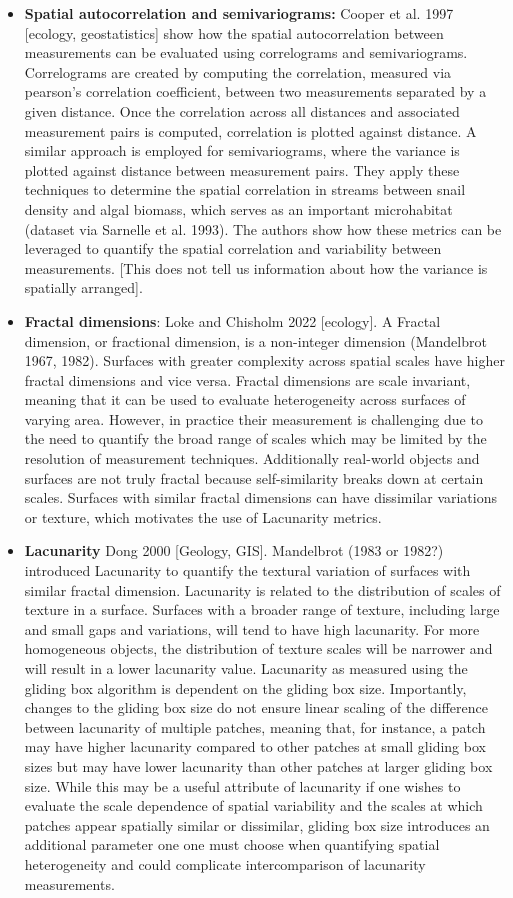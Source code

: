 \begin{itemize}
\item {\bf Spatial autocorrelation and semivariograms:} Cooper et al. 1997 [ecology, geostatistics] show how the spatial autocorrelation between measurements can be evaluated using correlograms and semivariograms. Correlograms are created by computing the correlation, measured via pearson’s correlation coefficient, between two measurements separated by a given distance. Once the correlation across all distances and associated measurement pairs is computed, correlation is plotted against distance. A similar approach is employed for semivariograms, where the variance is plotted against distance between measurement pairs. They apply these techniques to determine the spatial correlation in streams between snail density and algal biomass, which serves as an important microhabitat (dataset via Sarnelle et al. 1993). The authors show how these metrics can be leveraged to quantify the spatial correlation and variability between measurements. [This does not tell us information about how the variance is spatially arranged]. 
\item {\bf Fractal dimensions}: Loke and Chisholm 2022 [ecology]. A Fractal dimension, or fractional dimension, is a non-integer dimension (Mandelbrot 1967, 1982). Surfaces with greater complexity across spatial scales have higher fractal dimensions and vice versa. Fractal dimensions are scale invariant, meaning that it can be used to evaluate heterogeneity across surfaces of varying area. However, in practice their measurement is challenging due to the need to quantify the broad range of scales which may be limited by the resolution of measurement techniques. Additionally real-world objects and surfaces are not truly fractal because self-similarity breaks down at certain scales. Surfaces with similar fractal dimensions can have dissimilar variations or texture, which motivates the use of Lacunarity metrics.
\item {\bf Lacunarity} Dong 2000 [Geology, GIS]. Mandelbrot (1983 or 1982?) introduced Lacunarity to quantify the textural variation of surfaces with similar fractal dimension. 
Lacunarity is related to the distribution of scales of texture in a surface. Surfaces with a broader range of texture, including large and small gaps and variations, will tend to have high lacunarity. For more homogeneous objects, the distribution of texture scales will be narrower and will result in a lower lacunarity value. Lacunarity as measured using the gliding box algorithm is dependent on the gliding box size. Importantly, changes to the gliding box size do not ensure linear scaling of the difference between lacunarity of multiple patches, meaning that, for instance, a patch may have higher lacunarity compared to other patches at small gliding box sizes but may have lower lacunarity than other patches at larger gliding box size. While this may be a useful attribute of lacunarity if one wishes to evaluate the scale dependence of spatial variability and the scales at which patches appear spatially similar or dissimilar, gliding box size introduces an additional parameter one one must choose when quantifying spatial heterogeneity and could complicate intercomparison of lacunarity measurements.

\end{itemize}
